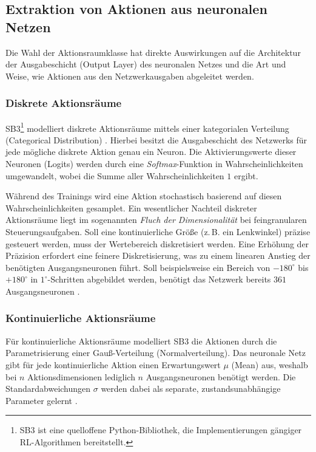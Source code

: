 \subsection*{Extraktion von Aktionen aus neuronalen Netzen}
\label{sc:action_extraction}
Die Wahl der Aktionsraumklasse hat direkte Auswirkungen auf die Architektur der Ausgabeschicht (Output Layer) des neuronalen Netzes und die Art und Weise, wie Aktionen aus den Netzwerkausgaben abgeleitet werden.

\subsubsection*{Diskrete Aktionsräume}
\ac{SB3}\footnote{\ac{SB3} ist eine quelloffene Python\hyp{}Bibliothek, die Implementierungen gängiger \ac{RL}\hyp{}Algorithmen bereitstellt.} modelliert diskrete Aktionsräume mittels einer kategorialen Verteilung (Categorical Distribution) \cite{sb3}. Hierbei besitzt die Ausgabeschicht des Netzwerks für jede mögliche diskrete Aktion genau ein Neuron. Die Aktivierungswerte dieser Neuronen (Logits) werden durch eine \emph{Softmax}-Funktion in Wahrscheinlichkeiten umgewandelt, wobei die Summe aller Wahrscheinlichkeiten $1$ ergibt.
\medskip

Während des Trainings wird eine Aktion stochastisch basierend auf diesen Wahrscheinlichkeiten gesamplet. Ein wesentlicher Nachteil diskreter Aktionsräume liegt im sogenannten \emph{Fluch der Dimensionalität} bei feingranularen Steuerungsaufgaben. Soll eine kontinuierliche Größe (z.\,B. ein Lenkwinkel) präzise gesteuert werden, muss der Wertebereich diskretisiert werden. Eine Erhöhung der Präzision erfordert eine feinere Diskretisierung, was zu einem linearen Anstieg der benötigten Ausgangsneuronen führt. Soll beispielsweise ein Bereich von $-180^\circ$ bis $+180^\circ$ in $1^\circ$-Schritten abgebildet werden, benötigt das Netzwerk bereits $361$ Ausgangsneuronen \cite{lillicrap2015continuous}.

\subsubsection*{Kontinuierliche Aktionsräume}
Für kontinuierliche Aktionsräume modelliert \ac{SB3} \cite{sb3} die Aktionen durch die Parametrisierung einer Gauß\hyp{}Verteilung (Normalverteilung). Das neuronale Netz gibt für jede kontinuierliche Aktion einen Erwartungswert $\mu$ (Mean) aus, weshalb bei $n$ Aktionsdimensionen lediglich $n$ Ausgangsneuronen benötigt werden. Die Standardabweichungen $\sigma$ werden dabei als separate, zustandsunabhängige Parameter gelernt \cite{sb3}.

